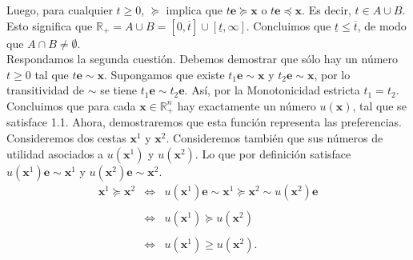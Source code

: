 \begin{teo}
	Luego, para cualquier $t\geq 0$, $\succeq$ implica que $t\textbf{e}\succeq \textbf{x}$ o $t\textbf{e}\preceq \textbf{x}$. Es decir, $t\in A\cup B$. Esto significa que $\mathbb{R}_+=A\cup B=[0,\overline{t}]\cup [\underline{t},\infty]$. Concluimos que $\underline{t}\leq \overline{t}$, de modo que $A\cap B\neq \emptyset$.\\

	Respondamos la segunda cuestión. Debemos demostrar que sólo hay un número $t\geq 0$ tal que $t\textbf{e}\sim \textbf{x}$. Supongamos que existe $t_1\textbf{e}\sim \textbf{x}$ y $t_2\textbf{e}\sim\textbf{x}$, por lo transitividad de $\sim$ se tiene $t_1\textbf{e}\sim t_2\textbf{e}$. Así, por la Monotonicidad estricta $t_1=t_2$.\\

	Concluimos que para cada $\textbf{x}\in \mathbb{R}_+^n$ hay exactamente un número $u(\textbf{x})$, tal que se satisface 1.1. Ahora, demostraremos que esta función representa las preferencias.\\

	Consideremos dos cestas $\textbf{x}^1$ y $\textbf{x}^2$. Consideremos también que sus números de utilidad asociados a $u(\textbf{x}^1)$ y $u(\textbf{x}^2)$. Lo que por definición satisface $u(\textbf{x}^1)\textbf{e}\sim\textbf{x}^1$ y $u(\textbf{x}^2)\textbf{e}\sim\textbf{x}^2$. 
	$$
	\begin{array}{rcl}
	    \textbf{x}^1 \succeq \textbf{x}^2 &\iff& u(\textbf{x}^1)\textbf{e}\sim \textbf{x}^1\succeq \textbf{x}^2 \sim u(\textbf{x}^2)\textbf{e}\\\\
					      &\iff& u(\textbf{x}^1)\succeq u(\textbf{x}^2)\\\\
					      &\iff& u(\textbf{x}^1)\geq u(\textbf{x}^2).
	\end{array}
	$$


\end{teo}
